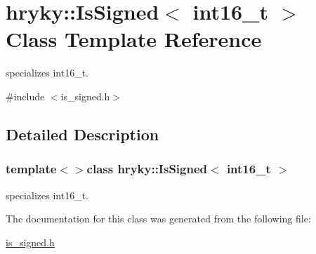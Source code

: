 \hypertarget{classhryky_1_1_is_signed_3_01int16__t_01_4}{\section{hryky\-:\-:Is\-Signed$<$ int16\-\_\-t $>$ Class Template Reference}
\label{classhryky_1_1_is_signed_3_01int16__t_01_4}
}


specializes int16\-\_\-t.  




{\ttfamily \#include $<$is\-\_\-signed.\-h$>$}



\subsection{Detailed Description}
\subsubsection*{template$<$$>$class hryky\-::\-Is\-Signed$<$ int16\-\_\-t $>$}

specializes int16\-\_\-t. 

The documentation for this class was generated from the following file\-:\begin{DoxyCompactItemize}
\item 
\hyperlink{is__signed_8h}{is\-\_\-signed.\-h}\end{DoxyCompactItemize}
